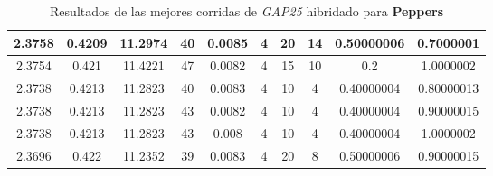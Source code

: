 \begin{table}[h!]
\begin{center}
\begin{tabular}{|c|c|c|c|c|c|c|c|c|c|}
        \hline
        \hline
            2.3758 & 0.4209  & 11.2974 & 40 & 0.0085 & 4 & 20 & 14 & 0.50000006 & 0.7000001\\
        \hline
        \hline
            2.3754 & 0.421  & 11.4221 & 47 & 0.0082 & 4 & 15 & 10 & 0.2 & 1.0000002\\
        \hline
        \hline
            2.3738 & 0.4213  & 11.2823 & 40 & 0.0083 & 4 & 10 & 4 & 0.40000004 & 0.80000013\\
        \hline
        \hline
            2.3738 & 0.4213  & 11.2823 & 43 & 0.0082 & 4 & 10 & 4 & 0.40000004 & 0.90000015\\
        \hline
        \hline
            2.3738 & 0.4213  & 11.2823 & 43 & 0.008 & 4 & 10 & 4 & 0.40000004 & 1.0000002\\
        \hline
        \hline
            2.3696 & 0.422  & 11.2352 & 39 & 0.0083 & 4 & 20 & 8 & 0.50000006 & 0.90000015\\
        \hline
        \end{tabular}
        \caption{Resultados de las mejores corridas de \emph{GAP25} hibridado para {\bf Peppers}}
        \label{tb:tableGAP25}
    \end{center}
\end{table}
